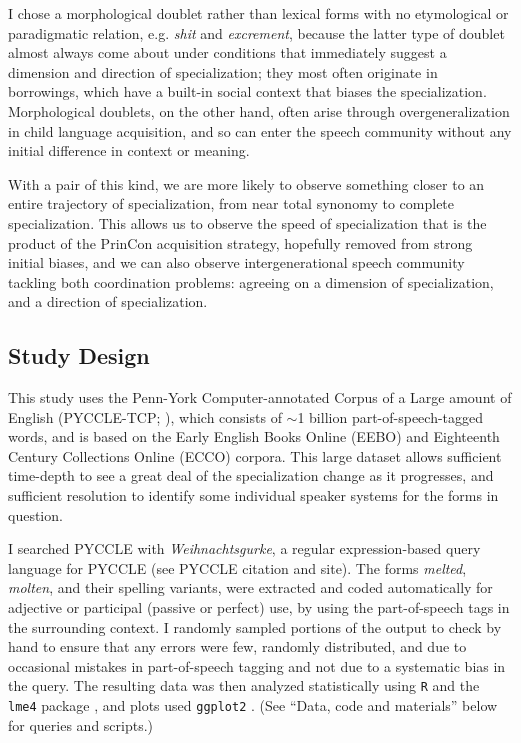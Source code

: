\documentclass{artikel3}
\begin{document}
I chose a morphological doublet rather than lexical forms with no etymological or paradigmatic relation, e.g. \textsl{shit} and \textsl{excrement}, because the latter type of doublet almost always come about under conditions that immediately suggest a dimension and direction of specialization; they most often originate in borrowings, which have a built-in social context that biases the specialization. Morphological doublets, on the other hand, often arise through overgeneralization in child language acquisition, and so can enter the speech community without any initial difference in context or meaning.

With a pair of this kind, we are more likely to observe something closer to an entire trajectory of specialization, from near total synonomy to complete specialization. This allows us to observe the speed of specialization that is the product of the PrinCon acquisition strategy, hopefully removed from strong initial biases, and we can also observe intergenerational speech community tackling both coordination problems: agreeing on a dimension of specialization, and a direction of specialization.

\subsection{Study Design}

This study uses the {P}enn-{Y}ork {C}omputer-annotated {C}orpus of a {L}arge amount of {E}nglish  (PYCCLE-TCP; \citealt{pyccle}), which consists of $\sim$1 billion part-of-speech-tagged words, and is based on the Early English Books Online (EEBO) and Eighteenth Century Collections Online (ECCO) corpora. This large dataset allows sufficient time-depth to see a great deal of the specialization change as it progresses, and sufficient resolution to identify some individual speaker systems for the forms in question.

I searched PYCCLE with \textsl{Weihnachtsgurke}, a regular expression-based query language for PYCCLE (see PYCCLE citation and site). The forms \textsl{melted}, \textsl{molten}, and their spelling variants, were extracted and coded automatically for adjective or participal (passive or perfect) use, by using the part-of-speech tags in the surrounding context. I randomly sampled portions of the output to check by hand to ensure that any errors were few, randomly distributed, and due to occasional mistakes in part-of-speech tagging and not due to a systematic bias in the query. The resulting data was then analyzed statistically using \texttt{R} and the \texttt{lme4} package \citep{lme4}, and plots used \texttt{ggplot2} \citep{ggplot2}. (See ``Data, code and materials'' below for queries and scripts.)
\end{document}
